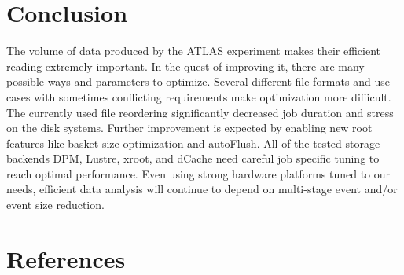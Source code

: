 \documentclass[a4paper]{jpconf}
\begin{document}
\section{Conclusion}
The volume of data produced by the ATLAS experiment makes their efficient reading extremely important. In the quest of improving it, there are many possible ways and parameters to optimize. Several different file formats and use cases with sometimes conflicting requirements make optimization more difficult. The currently used file reordering significantly decreased job duration and stress on the disk systems. Further improvement is expected by enabling new root features like basket size optimization and autoFlush.
All of the tested storage backends DPM, Lustre, xroot, and dCache need careful job specific tuning to reach optimal performance. Even using strong hardware platforms tuned to our needs, efficient data analysis will continue to depend on multi-stage event and/or event size reduction.


\section*{References}

  
\end{document}
